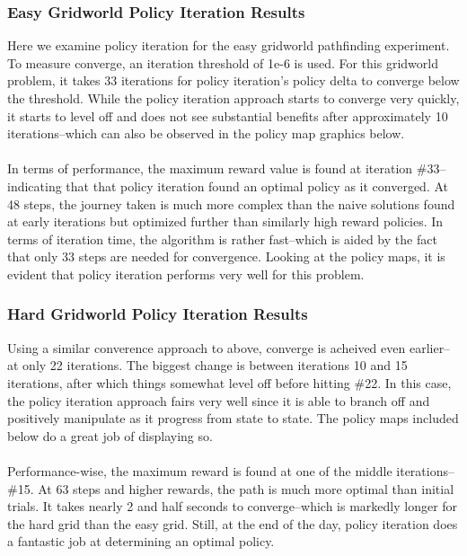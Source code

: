 \documentclass[h]{article}
\begin{document}
 \subsubsection*{Easy Gridworld Policy Iteration Results}
Here we examine policy iteration for the easy gridworld pathfinding experiment.  To measure converge, an iteration threshold of 1e-6 is used.  For this 
 gridworld problem, it takes 33 iterations for policy iteration's policy delta to converge 
 below the threshold.  While the policy iteration approach starts to converge 
 very quickly, it starts to level off and does not see substantial benefits 
 after approximately 10 iterations--which can also be observed in the policy map 
 graphics below.
 \\ \\
 In terms of performance, the maximum reward value is found at iteration \#33--indicating 
 that that policy iteration found an optimal policy as it converged.  At 48 steps, the journey 
 taken is much more complex than the naive solutions found at early iterations but optimized further than similarly high reward policies.  
  In terms of iteration time, the algorithm is rather fast--which is aided by the fact that only 33 steps are needed for convergence.
   Looking at the policy maps, it is evident that policy iteration performs very well for this problem. 
 
  \subsubsection*{Hard Gridworld Policy Iteration Results}
 Using a similar converence approach to above, converge is acheived even 
 earlier--at only 22 iterations.  The biggest change is between iterations 10 and 15 
 iterations, after which things somewhat level off before hitting \#22.  In this 
 case, the policy iteration approach fairs very well since it is able to branch 
 off and positively manipulate as it progress from state to state.  The policy 
 maps included below do a great job of displaying so.
 \\ \\
 Performance-wise, the maximum reward is found at one of the middle iterations--\#15.  At 63 steps and higher rewards, the path is much more optimal than initial trials.
  It takes nearly 2 and half seconds to converge--which is markedly longer for 
  the hard grid than the easy grid.  Still, at the end of the day, policy 
  iteration does a fantastic job at determining an optimal policy.
 
\end{document}
